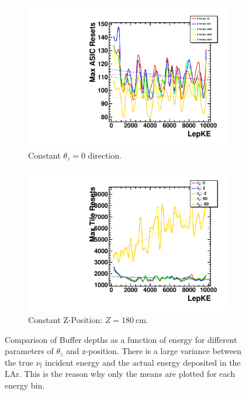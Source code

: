 \begin{figure}
\centering
\begin{subfigure}{.5\textwidth}
  \centering
  \includegraphics[width=\textwidth]{images/Const_Theta0_ASIC_lepKE_multigraph_pdg12_fhc.pdf}
  \caption{Constant $\theta_{z} = 0$ direction.}
\end{subfigure}%
\begin{subfigure}{.5\textwidth}
  \centering
  \includegraphics[width=\textwidth]{images/Const_Z180_ASIC_lepKE_multigraph_pdg12_fhc.pdf}
  \caption{Constant Z-Position: $Z = 180~$\unit{cm}.}
\end{subfigure}
\caption{Comparison of Buffer depths as a function of energy for different parameters of $\theta_{z}$ and z-position.
There is a large variance between the true $\nu_{l}$ incident energy and the actual energy deposited in the LAr.
This is the reason why only the means are plotted for each energy bin.
}
\label{fig:example_asic_energy_comparison}
\end{figure}

